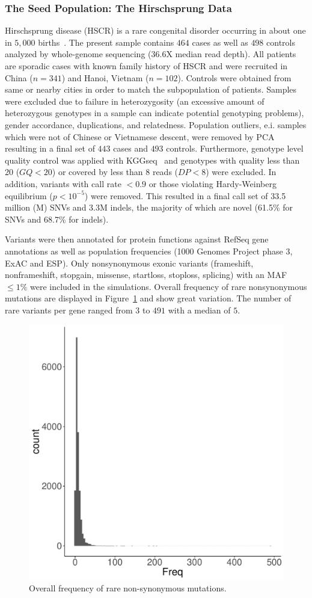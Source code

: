 \subsubsection{The Seed Population: The Hirschsprung Data}
\label{ssub:The_Seed_population:_The_Hirschsprung_data}
Hirschsprung disease (HSCR) is a rare congenital disorder occurring in about one in $5,000$ births~\cite{Amiel2001}.
The present sample contains $464$ cases as well as $498$ controls analyzed by whole-genome sequencing (36.6X median read depth).
All patients are sporadic cases with known family history of HSCR and were recruited in China ($n=341$) and Hanoi, Vietnam ($n=102$).
Controls were obtained from same or nearby cities in order to match the subpopulation of patients.
Samples were excluded due to failure in heterozygosity (an excessive amount of heterozygous genotypes in a sample can indicate potential genotyping problems), gender accordance, duplications, and relatedness.
Population outliers, e.i. samples which were not of Chinese or Vietnamese descent, were removed by PCA resulting in a final set of $443$ cases and $493$ controls.
Furthermore, genotype level quality control was applied with KGGseq~\cite{Li2012b} and genotypes with quality less than 20 ($GQ<20$) or covered by less than 8 reads ($DP<8$) were excluded.
In addition, variants with call rate $<0.9$ or those violating Hardy-Weinberg equilibrium ($p<10^{-5}$) were removed.
This resulted in a final call set of 33.5 million (M) SNVs and 3.3M indels, the majority of which are novel (61.5\% for SNVs and 68.7\% for indels). 

Variants were then annotated for protein functions against RefSeq gene annotations as well as population frequencies (1000 Genomes Project phase 3, ExAC and ESP).
Only nonsynonymous exonic variants (frameshift, nonframeshift, stopgain, missense, startloss, stoploss, splicing) with an MAF $\leq 1\%$ were included in the simulations. 
Overall frequency of rare nonsynonymous mutations are displayed in Figure~\ref{fig:num_var} and show great variation.
The number of rare variants per gene ranged from $3$ to $491$ with a median of $5$.

\begin{figure}[htpb]
  \centering
  \includegraphics[width=0.5\linewidth]{ksburden/figures/number_var_genes.pdf}
  \caption[Frequency of rare variants]{Overall frequency of rare non-synonymous mutations.}\label{fig:num_var}
\end{figure}

